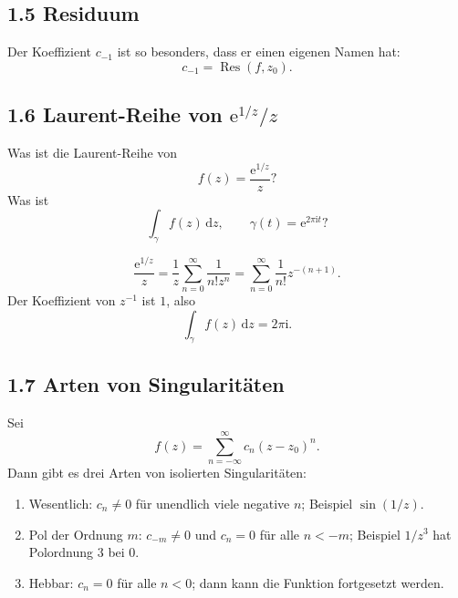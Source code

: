 \documentclass[11pt,a4paper]{article}
\newcommand{\ii}{\mathrm i}
\newcommand{\ee}{\mathrm e}
\newcommand{\dd}{\,\mathrm d}
\newcommand{\Res}{\operatorname{Res}}
\begin{document}
\subsection{1.5 Residuum}
\begin{importantbox}
Der Koeffizient $c_{-1}$ ist so besonders, dass er einen eigenen Namen hat:
\[
c_{-1}=\Res(f,z_0).
\]
\end{importantbox}

\subsection{1.6 Laurent-Reihe von $\ee^{1/z}/z$}
\begin{fragebox}
Was ist die Laurent-Reihe von
\[
f(z)=\frac{\ee^{1/z}}{z}?
\]
Was ist
\[
\int_\gamma f(z)\dd z,
\qquad \gamma(t)=\ee^{2\pi\ii t}?
\]
\end{fragebox}
\begin{antwortbox}
\[
\frac{\ee^{1/z}}{z}=\frac1z\sum_{n=0}^{\infty}\frac1{n!z^n}
=\sum_{n=0}^{\infty}\frac1{n!}z^{-(n+1)}.
\]
Der Koeffizient von $z^{-1}$ ist $1$, also
\[
\int_\gamma f(z)\dd z=2\pi\ii.
\]
\end{antwortbox}

\subsection{1.7 Arten von Singularitäten}
Sei
\[
f(z)=\sum_{n=-\infty}^{\infty}c_n(z-z_0)^n.
\]
Dann gibt es drei Arten von isolierten Singularitäten:
\begin{enumerate}[label=\Roman*.]
\item Wesentlich: $c_n\neq0$ für unendlich viele negative $n$; Beispiel $\sin(1/z)$.
\item Pol der Ordnung $m$: $c_{-m}\neq0$ und $c_n=0$ für alle $n<-m$; Beispiel $1/z^3$ hat Polordnung $3$ bei $0$.
\item Hebbar: $c_n=0$ für alle $n<0$; dann kann die Funktion fortgesetzt werden.
\end{enumerate}
\end{document}
